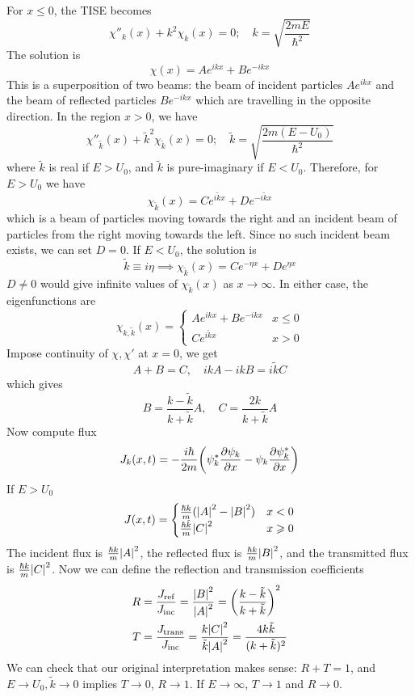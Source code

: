 \documentclass[a4paper,11pt]{article}
\begin{document}
For \( x \leq 0 \), the TISE becomes
\[
	\chi''_k(x) + k^2 \chi_k(x) = 0;\quad k = \sqrt{\frac{2mE}{\hbar^2}}
\]
The solution is
\[
	\chi(x) = Ae^{ikx} + Be^{-ikx}
\]
This is a superposition of two beams: the beam of incident particles \( Ae^{ikx} \) and the beam of reflected particles \( Be^{-ikx} \) which are travelling in the opposite direction.
In the region \( x > 0 \), we have
\[
	\chi''_{\tilde k}(x) + \tilde k^2 \chi_{\tilde k}(x) = 0;\quad \tilde k = \sqrt{\frac{2m(E-U_0)}{\hbar^2}}
\]
where \( \tilde k \) is real if \( E > U_0 \), and \( \tilde k \) is pure-imaginary if \( E < U_0 \).
Therefore, for \( E > U_0 \) we have
\[
	\chi_{\tilde k}(x) = Ce^{i \tilde k x} + De^{-i \tilde k x}
\]
which is a beam of particles moving towards the right and an incident beam of particles from the right moving towards the left.
Since no such incident beam exists, we can set \( D = 0 \).
If \( E < U_0 \), the solution is
\[
	\tilde k \equiv i \eta \implies \chi_{\tilde k}(x) = Ce^{-\eta x} + De^{\eta x}
\]
\( D \neq 0 \) would give infinite values of \( \chi_{\tilde k}(x) \) as \( x \to \infty \).
In either case, the eigenfunctions are
\[
	\chi_{k, \tilde k}(x) =
	\begin{cases}
		Ae^{ikx} + Be^{-ikx} & x \leq 0 \\
		Ce^{i \tilde k x} & x > 0
	\end{cases}
\]
Impose continuity of $\chi,\chi'$ at $x=0$, we get
\[
	A + B = C,\quad ikA - ikB = i\tilde k C
\]
which gives
\[
	B = \frac{k - \tilde k}{k + \tilde k} A,\quad C = \frac{2k}{k + \tilde k}A
\]
Now compute flux
\[
	J_k(x,t) = - \frac{i\hbar}{2m} \qty(\psi^*_k \pdv{\psi_k}{x} - \psi_k \pdv{\psi_k^*}{x})
\]
If \( E > U_0 \)
\[
	J(x,t) =
	\begin{cases}
		\frac{\hbar k}{m} (\abs{A}^2 - \abs{B}^2) & x < 0    \\
		\frac{\hbar \tilde k}{m} \abs{C}^2     & x \geqslant 0
	\end{cases}
\]
The incident flux is \( \frac{\hbar k}{m} \abs{A}^2 \), the reflected flux is \( \frac{\hbar k}{m} \abs{B}^2 \), and the transmitted flux is \( \frac{\hbar k}{m} \abs{C}^2 \).
Now we can define the reflection and transmission coefficients 
\begin{align*}
    R &= \frac{J_{\text{ref}}}{J_{\text{inc}}} = \frac{\abs{B}^2}{\abs{A}^2} = \qty(\frac{k - \tilde k}{k + \tilde k})^2\\ 
	T &= \frac{J_{\text{trans}}}{J_{\text{inc}}} = \frac{k\abs{C}^2}{\tilde k\abs{A}^2} = \frac{4k \tilde k}{(k + \tilde k)^2}
\end{align*}
We can check that our original interpretation makes sense: \( R + T = 1 \), and \( E \to U_0, \tilde k \to 0 \) implies \( T \to 0 \), \( R \to 1 \).
If \( E \to \infty \), \( T \to 1 \) and \( R \to 0 \).
\end{document}
